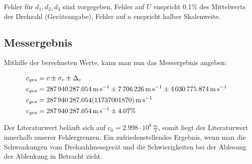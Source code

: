  Fehler für $d_1,d_2,d_3$ sind vorgegeben, Fehler auf $U$ enspricht 0.1\% des Mittelwerts der Drehzahl (Geräteangabe), Fehler auf $a$ enspricht halber Skalenweite.

\subsection{Messergebnis}

Mithilfe der berechneten Werte, kann man nun das Messergebnis angeben:

\begin{align}
    c_{ges} &= c \pm \sigma_c \pm \Delta_c \\
    c_{ges} &= \SI{287940287.054}{\metre\per\second} \pm \SI{7706226}{\metre\per\second} \pm  \SI{4030775.874}{\metre\per\second}\\
    c_{ges} &= \SI{287940287.054 \pm 11737001.87}{\metre\per\second} \\
     c_{ges} &= \SI{287940287.054}{\metre\per\second} \pm 4.07 \%
\end{align}

Der Literaturwert beläuft sich auf $c_0 = 2.998 \cdot 10^8 \, \frac{m}{s}$, somit liegt der Literaturwert innerhalb unserer Fehlergrenzen.
Ein zufriedenstellendes Ergebnis, wenn man die Schwankungen vom Drehzahlmessgerät und die Schwierigkeiten bei der Ablesung der Ablenkung in Betracht zieht.
